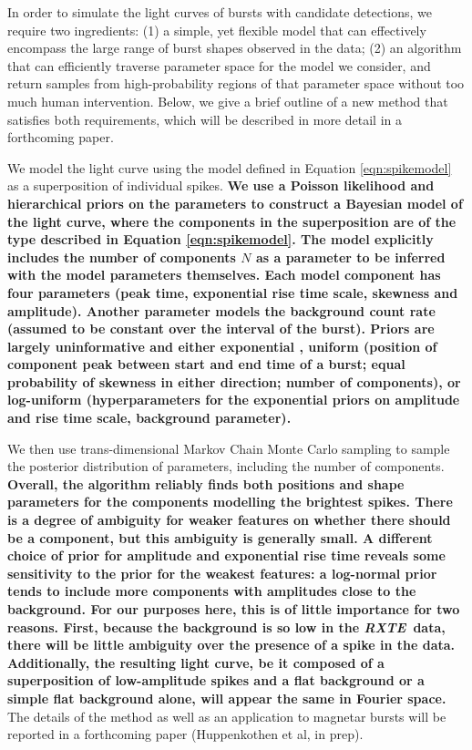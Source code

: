 \documentclass[numberedappendix]{emulateapj}
\newcommand{\project}[1]{\textsl{#1}}
\newcommand{\rxte}{\project{RXTE}}
\begin{document}
In order to simulate the light curves of bursts with candidate detections, we require two ingredients: (1) a simple, yet flexible model that can effectively encompass the large range of burst shapes observed in the data; (2) an algorithm that can efficiently traverse parameter space for the model we consider, and return samples from high-probability regions of that parameter space without too much human intervention. Below, we give a brief outline of a new method that satisfies both requirements, which will be described in more detail in a forthcoming paper.

We model the light curve using the model defined in Equation \ref{eqn:spikemodel} as a superposition of individual spikes. \textbf{We use a Poisson likelihood and hierarchical priors on the parameters to construct a Bayesian model of the light curve, where the components in the superposition are of the type described in Equation \ref{eqn:spikemodel}. The model explicitly includes the number of components $N$ as a parameter to be inferred with the model parameters themselves. Each model component has four parameters (peak time, exponential rise time scale, skewness and amplitude). Another parameter models the background count rate (assumed to be constant over the interval of the burst). Priors are largely uninformative and either exponential \citep[amplitude, rise time scale; see also][]{skilling1998}, uniform (position of component peak between start and end time of a burst; equal probability of skewness in either direction; number of components), or log-uniform (hyperparameters for the exponential priors on amplitude and rise time scale, background parameter). }

We then use trans-dimensional Markov Chain Monte Carlo sampling \citep[in the form of diffusive nested sampling; ][]{brewer2011} to sample the posterior distribution of parameters, including the number of components. \textbf{Overall, the algorithm reliably finds both positions and shape parameters for the components modelling the brightest spikes. There is a degree of ambiguity for weaker features on whether there should be a component, but this ambiguity is generally small. A different choice of prior for amplitude and exponential rise time reveals some sensitivity to the prior for the weakest features: a log-normal prior tends to include more components with amplitudes close to the background. For our purposes here, this is of little importance for two reasons. First, because the background is so low in the \rxte\ data, there will be little ambiguity over the presence of a spike in the data. Additionally, the resulting light curve, be it composed of a superposition of low-amplitude spikes and a flat background or a simple flat background alone, will appear the same in Fourier space.} The details of the method as well as an application to magnetar bursts will be reported in a forthcoming paper (Huppenkothen et al, in prep). 
\end{document}
